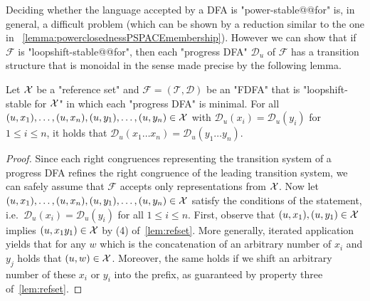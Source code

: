 \documentclass[a4paper,USenglish,cleveref,autoref,thm-restate]{lipics-v2021}
\newcommand{\mc}[1]{\ensuremath{\mathcal{#1}}}
\newcommand{\T}{\mc{T}}
\newcommand{\F}{\mc{F}}
\newcommand{\D}{\mc{D}}
\begin{document}
{Deciding whether the language accepted by a DFA is "power-stable@@for" is, in general, a difficult problem (which can be shown by a reduction similar to the one in ~\cref{lemma:powerclosednessPSPACEmembership}).
However we can show that if $\F$ is "loopshift-stable@@for", then each "progress DFA" $\D_u$ of $\F$ has a transition structure that is monoidal in the sense made precise by the following lemma.

\begin{lemma}
  Let $\mathcal{X}$ be a "reference set" and $\F = (\T, \D)$ be an "FDFA" that is "loopshift-stable for $\mathcal{X}$" in which each "progress DFA" is minimal.
  For all $(u,x_1), \dots, (u,x_n), (u,y_1),\dots,(u,y_n) \in \mathcal{X}$ with $\D_u(x_i) = \D_u(y_i)$ for $1 \leq i \leq n$, it holds that $\D_u(x_1 \dotsc x_n) = \D_u(y_1 \dotsc y_n)$.\label{app:lemma:rotationinvarianceproperty}
\end{lemma}
\begin{proof}
  Since each right congruences representing the transition system of a progress DFA refines the right congruence of the leading transition system, we can safely assume that $\F$ accepts only representations from $\mathcal{X}$.
  Now let $(u,x_1), \dots, (u,x_n), (u,y_1),\dots,(u,y_n) \in \mathcal{X}$ satisfy the conditions of the statement, i.e.~$\D_u(x_i) = \D_u(y_i)$ for all $1 \leq i \leq n$.
  First, observe that $(u,x_1), (u,y_1) \in \mathcal{X}$ implies $(u,x_1y_1) \in \mathcal{X}$ by (4) of~\cref{lem:refset}.
  More generally, iterated application yields that for any $w$ which is the concatenation of an arbitrary number of $x_i$ and $y_j$ holds that $(u,w) \in \mathcal{X}$.
  Moreover, the same holds if we shift an arbitrary number of these $x_i$ or $y_i$ into the prefix, as guaranteed by property three of~\cref{lem:refset}.
  

\end{proof}}
\end{document}
